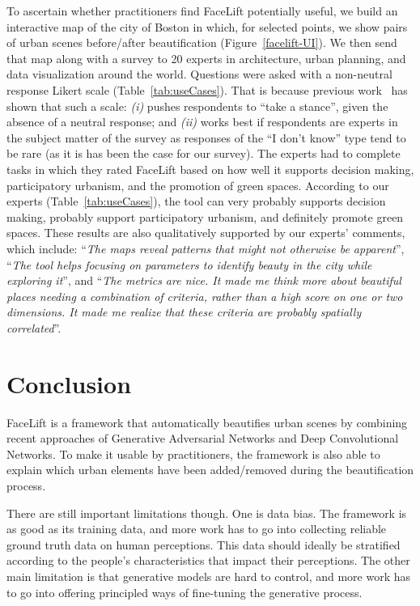 To ascertain whether practitioners find FaceLift potentially useful, we build an interactive map of the city of Boston in which, for  selected points, we show pairs of urban scenes before/after beautification (Figure~\ref{facelift-UI}). We then send that map along with a survey to 20 experts in architecture, urban planning, and data visualization around the world. Questions were asked with a non-neutral response Likert scale (Table~\ref{tab:useCases}). That is because previous work~\cite{Agree2012,moors2008exploring} has shown that such a scale: \emph{(i)} pushes respondents to ``take a stance'', given the absence of a neutral response; and \emph{(ii)} works best if respondents are experts in the subject matter of the survey as responses of the ``I don't know'' type tend to be rare (as it is has been the case for our survey). The experts had to complete tasks in which they rated FaceLift based on how well it supports decision making, participatory urbanism, and the promotion of green spaces. According to our experts (Table~\ref{tab:useCases}), the tool can very probably supports decision making, probably support participatory urbanism, and definitely promote green spaces.  These results are  also qualitatively supported by our experts' comments, which include: ``\textit{The maps reveal patterns that might not otherwise be apparent}'',  ``\textit{The tool helps focusing on parameters to identify beauty in the city while exploring it}'',  and ``\textit{The metrics are nice. It made me think more about beautiful places needing a combination of criteria, rather than a high score on one or two dimensions. It made me realize that these criteria are probably spatially correlated}''.






\section{Conclusion}
\label{sec:discussion}

FaceLift is a  framework that automatically beautifies urban scenes by combining recent approaches of Generative Adversarial Networks and Deep Convolutional Networks. To make it usable by practitioners, the framework is also able to explain which urban elements have been added/removed during the beautification process. 

There are still important limitations though. One is data bias. The framework is as good as its training data, and more work has to go into collecting reliable ground truth data on human perceptions. This data should ideally be stratified according to the people's characteristics that  impact their perceptions. The other main limitation is that generative models are hard to control, and more work has to go into offering principled ways of fine-tuning the generative process.

